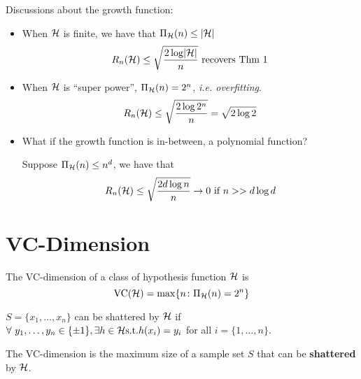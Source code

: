 \begin{remark}
    Discussions about the growth function: 
    \begin{itemize}
        \item When \(\mathcal{H}\) is finite, we have that \(\Pi_{\mathcal{H}} (n) \leq \lvert \mathcal{H} \rvert\) 
        \[
            R_n (\mathcal{H}) \leq \sqrt{ \frac{2\log \lvert \mathcal{H} \rvert}{n} } \text{ recovers Thm 1}  
        \]
        \item When \(\mathcal{H}\) is ``super power'', \(\Pi_{\mathcal{H}} (n) = 2^n\), \emph{i.e. overfitting}. 
        \[
            R_n (\mathcal{H}) \leq \sqrt{ \frac{2 \log 2^n}{n}} = \sqrt{2 \log 2}  
        \]
        \item What if the growth function is in-between, a polynomial function? 
        
        Suppose \(\Pi_{\mathcal{H}} (n) \leq n^d\), we have that 
        \[
            R_n(\mathcal{H}) \leq \sqrt{ \frac{2 d \log n}{n}} \to 0 \text{ if } n >> d \log d 
        \]
    \end{itemize}
\end{remark}


\section{VC-Dimension}

\begin{definition}[VC-dimension]\label{def:VC_dimension}
    The VC-dimension of a class of hypothesis function \(\mathcal{H}\) is 
    \[
        \text{VC}(\mathcal{H}) = \max \{ n \colon \Pi_{\mathcal{H}} (n) = 2^n \}  
    \]
\end{definition}

\begin{definition}[Shatter]\label{def:shatter}
    \(S = \{x_1, \ldots, x_n\}\) can be shattered by \(\mathcal{H}\) if 
    \(\forall \ y_1, \ldots, y_n \in \{\pm 1\}, \exists h \in \mathcal{H} \text{s.t.} h(x_i)=y_i\)
    for all \(i = \{1, \ldots, n\}\). 
\end{definition}

\begin{remark}
    The VC-dimension is the maximum size of a sample set \(S\) that can be \textbf{shattered}
    by \(\mathcal{H}\). 
\end{remark}

